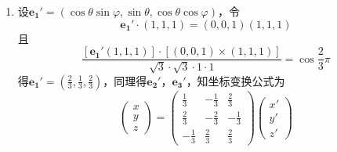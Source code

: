 \documentclass[UTF8]{ctexart}
\begin{document}
\begin{enumerate}
\item 设$\mathbf{e_1}'=\left(\cos\theta\sin\varphi,\sin\theta,\cos\theta\cos\varphi\right)$，令
$$\mathbf{e_1}'\cdot\left(1,1,1\right)=\left(0,0,1\right)\left(1,1,1\right)$$
且
$$\displaystyle\frac{\left[\mathbf{e_1}'\left(1,1,1\right)\right]\cdot\left[\left(0,0,1\right)\times\left(1,1,1\right)\right]}{\sqrt{3}\cdot\sqrt{3}\cdot1\cdot1}=\cos\displaystyle\frac{2}{3}\pi$$
得$\mathbf{e_1}'=\left(\displaystyle\frac{2}{3},\displaystyle\frac{1}{3},\displaystyle\frac{2}{3}\right)$，同理得$\mathbf{e_2}'，\mathbf{e_3}'$，知坐标变换公式为
$$\left(\begin{array}{c}x\\y\\z\end{array}\right)=\left(\begin{array}{ccc}\displaystyle\frac{1}{3}&\displaystyle-\frac{1}{3}&\displaystyle\frac{2}{3}\\\displaystyle\frac{2}{3}&\displaystyle-\frac{2}{3}&-\displaystyle\frac{1}{3}\\\displaystyle-\frac{1}{3}&\displaystyle\frac{2}{3}&\displaystyle\frac{2}{3}\end{array}\right)\left(\begin{array}{c}x'\\y'\\z'\end{array}\right)$$

\end{enumerate}
\end{document}
